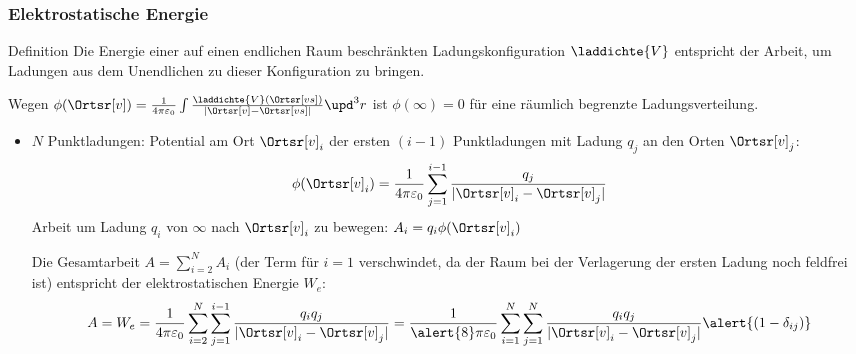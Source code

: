 \begin{frame}
  \frametitle{Elektrostatische Energie}
  \begin{block}{Definition}
    Die \alert{Energie} einer auf einen \alert{endlichen Raum} beschränkten
    Ladungskonfiguration $\laddichte{V}$ entspricht der Arbeit, um
    Ladungen aus dem Unendlichen zu dieser Konfiguration zu bringen.

    Wegen $\phi(\Ortsr[v]) =
    \frac{1}{4\pi\varepsilon_0}\int\frac{\laddichte{V}(\Ortsr[vs])}{\left|\Ortsr[v]-\Ortsr[vs]\right|}
    \upd^3r$ ist \alert{$\phi(\infty) = 0$} für eine räumlich begrenzte Ladungsverteilung.
  \end{block}
  \begin{itemize}[<+->]
  \item $N$ Punktladungen: Potential am Ort $\Ortsr[v]_i$ der ersten $(i-1)$ Punktladungen
    mit Ladung $q_j$ an den Orten $\Ortsr[v]_j$:
    $$
    \phi(\Ortsr[v]_i) = \frac{1}{4\pi\varepsilon_0} \sum_{j=1}^{i-1}
    \frac{q_j}{|\Ortsr[v]_i - \Ortsr[v]_j|}
    $$
    Arbeit um Ladung $q_i$ von $\infty$ nach $\Ortsr[v]_i$ zu bewegen: $A_i = q_i\phi(\Ortsr[v]_i)$

    Die Gesamtarbeit $A = \sum_{i=2}^N A_i$ (der Term für $i=1$
    verschwindet, da der Raum bei der Verlagerung der ersten Ladung
    noch feldfrei ist) entspricht der \alert{elektrostatischen
      Energie} $W_e$:
    $$A = W_e = \frac{1}{4\pi\varepsilon_0} \sum_{i=2}^N \sum_{j=1}^{i-1}
    \frac{q_i q_j}{|\Ortsr[v]_i - \Ortsr[v]_j|} = \frac{1}{\alert{8}\pi\varepsilon_0} \sum_{i=1}^N \sum_{j=1}^{N}
    \frac{q_i q_j}{|\Ortsr[v]_i - \Ortsr[v]_j|} \alert{(1-\delta_{ij})}
    $$
    \end{itemize}
  \end{frame}
